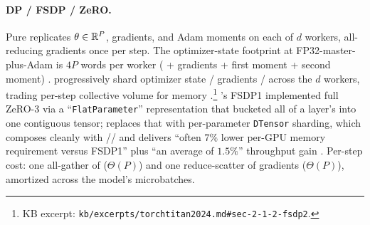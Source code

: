 \paragraph{DP / FSDP / ZeRO.} Pure  replicates  $\theta
\in \mathbb{R}^P$, gradients, and Adam moments on each of $d$ workers, all-
reducing gradients once per step. The optimizer-state footprint at
FP32-master-plus-Adam is $4P$ words per worker ( + gradients
+ first moment + second moment) \citep[\S 2]{kalamkar2019-bfloat16}.
 progressively shard optimizer state /
gradients /  across the $d$ workers, trading per-step
collective volume for memory \citep[\S 2.1.2]{torchtitan2024}.\footnote{KB
excerpt: \nolinkurl{kb/excerpts/torchtitan2024.md#sec-2-1-2-fsdp2}.}
's FSDP1 implemented full ZeRO-3 via a ``\texttt{FlatParameter}''
representation that bucketed all of a layer's  into one
contiguous tensor;  replaces that with per-parameter
\texttt{DTensor} sharding, which composes cleanly with // and
delivers ``often $7\%$ lower per-GPU memory requirement versus FSDP1''
plus ``an average of $1.5\%$'' throughput gain \citep[\S
2.1.2]{torchtitan2024}. Per-step cost: one all-gather of 
($\Theta(P)$) and one reduce-scatter of gradients ($\Theta(P)$),
amortized across the model's microbatches.

